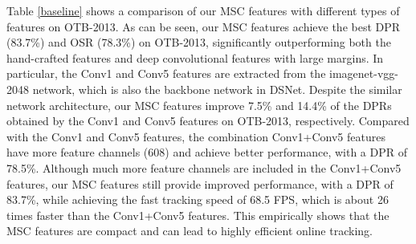 \documentclass[runningheads]{llncs}
\begin{document}
Table \ref{baseline} shows a comparison of our MSC features with different types of features on OTB-2013. As can be seen, our MSC features achieve the best DPR (83.7\%) and OSR (78.3\%) on OTB-2013, significantly outperforming both the hand-crafted features and deep convolutional features with large margins. In particular, the Conv1 and Conv5 features are extracted from the imagenet-vgg-2048 network, which is also the backbone network in DSNet. Despite the similar network architecture, our MSC features improve 7.5\% and 14.4\% of the DPRs obtained by the Conv1 and Conv5 features on OTB-2013, respectively. Compared with the Conv1 and Conv5 features, the combination Conv1+Conv5 features have more feature channels (608) and achieve better performance, with a DPR of 78.5\%. Although much more feature channels are included in the Conv1+Conv5 features, our MSC features still provide improved performance, with a DPR of 83.7\%, while achieving the fast tracking speed of 68.5 FPS, which is about 26 times faster than the Conv1+Conv5 features. This empirically shows that the MSC features are compact and can lead to highly efficient online tracking.




\end{document}

